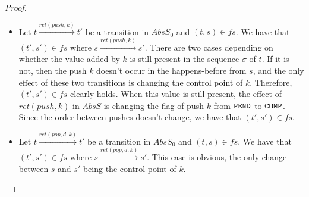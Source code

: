 \begin{proof}
\begin{itemize}
	\item Let $t\xrightarrow{ret(push,k)} t'$ be a transition in $AbsS_0$ and $(t,s)\in fs$. We have that $(t',s')\in fs$ where $s\xrightarrow{ret(push,k)} s'$. There are two cases depending on whether the value added by $k$ is still present in the sequence $\sigma$ of $t$. If it is not, then the push $k$ doesn't occur in the happens-before from $s$, and the only effect of these two transitions is changing the control point of $k$. Therefore, $(t',s')\in fs$ clearly holds. When this value is still present, the effect of $ret(push,k)$ in $AbsS$ is changing the flag of push $k$ from ${\tt PEND}$ to ${\tt COMP}$. Since the order between pushes doesn't change, we have that $(t',s')\in fs$.
	\item Let $t\xrightarrow{ret(pop,d,k)} t'$ be a transition in $AbsS_0$ and $(t,s)\in fs$. We have that $(t',s')\in fs$ where $s\xrightarrow{ret(pop,d,k)} s'$. This case is obvious, the only change between $s$ and $s'$ being the control point of $k$.
\end{itemize}


\end{proof}
